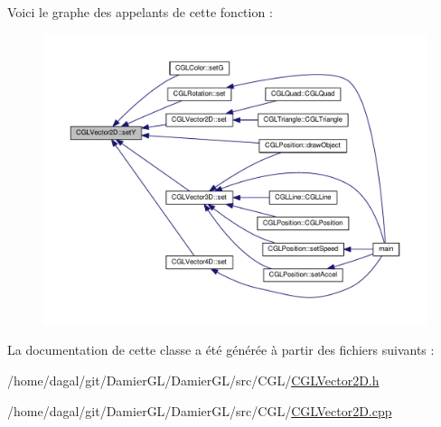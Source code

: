 Voici le graphe des appelants de cette fonction \-:
\nopagebreak
\begin{figure}[H]
\begin{center}
\leavevmode
\includegraphics[width=350pt]{d8/d97/class_c_g_l_vector2_d_a4c89a21e28a86848c6b023ad60baef4c_icgraph}
\end{center}
\end{figure}




La documentation de cette classe a été générée à partir des fichiers suivants \-:\begin{DoxyCompactItemize}
\item 
/home/dagal/git/\-Damier\-G\-L/\-Damier\-G\-L/src/\-C\-G\-L/\hyperlink{_c_g_l_vector2_d_8h}{C\-G\-L\-Vector2\-D.\-h}\item 
/home/dagal/git/\-Damier\-G\-L/\-Damier\-G\-L/src/\-C\-G\-L/\hyperlink{_c_g_l_vector2_d_8cpp}{C\-G\-L\-Vector2\-D.\-cpp}\end{DoxyCompactItemize}

